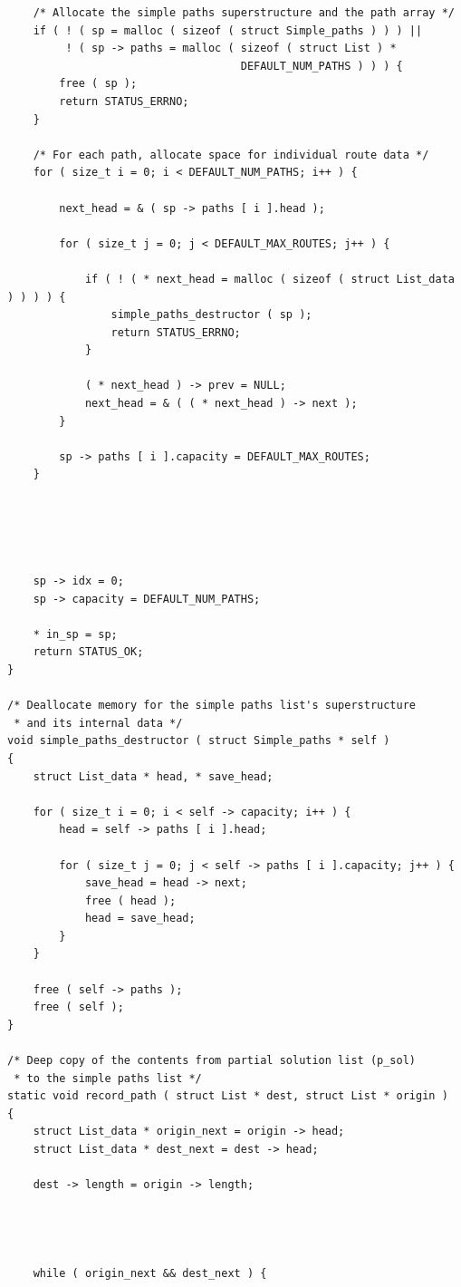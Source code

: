 \documentclass[11pt]{article}
\begin{document}
\begin{verbatim}
    /* Allocate the simple paths superstructure and the path array */
    if ( ! ( sp = malloc ( sizeof ( struct Simple_paths ) ) ) ||
         ! ( sp -> paths = malloc ( sizeof ( struct List ) *
                                    DEFAULT_NUM_PATHS ) ) ) {
        free ( sp );
        return STATUS_ERRNO;
    }

    /* For each path, allocate space for individual route data */
    for ( size_t i = 0; i < DEFAULT_NUM_PATHS; i++ ) {

        next_head = & ( sp -> paths [ i ].head );

        for ( size_t j = 0; j < DEFAULT_MAX_ROUTES; j++ ) {

            if ( ! ( * next_head = malloc ( sizeof ( struct List_data ) ) ) ) {
                simple_paths_destructor ( sp );
                return STATUS_ERRNO;
            }

            ( * next_head ) -> prev = NULL;
            next_head = & ( ( * next_head ) -> next );
        }

        sp -> paths [ i ].capacity = DEFAULT_MAX_ROUTES;
    }





    sp -> idx = 0;
    sp -> capacity = DEFAULT_NUM_PATHS;

    * in_sp = sp;
    return STATUS_OK;
}

/* Deallocate memory for the simple paths list's superstructure
 * and its internal data */
void simple_paths_destructor ( struct Simple_paths * self )
{
    struct List_data * head, * save_head;

    for ( size_t i = 0; i < self -> capacity; i++ ) {
        head = self -> paths [ i ].head;

        for ( size_t j = 0; j < self -> paths [ i ].capacity; j++ ) {
            save_head = head -> next;
            free ( head );
            head = save_head;
        }
    }

    free ( self -> paths );
    free ( self );
}

/* Deep copy of the contents from partial solution list (p_sol)
 * to the simple paths list */
static void record_path ( struct List * dest, struct List * origin )
{
    struct List_data * origin_next = origin -> head;
    struct List_data * dest_next = dest -> head;

    dest -> length = origin -> length;



    
    while ( origin_next && dest_next ) {


\end{verbatim}
\end{document}
